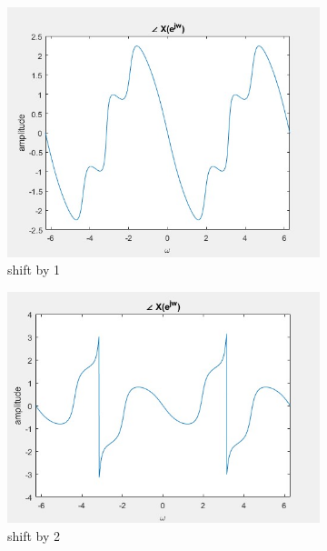 \documentclass[11pt]{article}
\begin{document}
\begin{figure}[h]
\centering
\begin{subfigure}[b]{.3\linewidth}
\includegraphics[width=\linewidth]{secondabout0}
\caption{shift by 1}
\end{subfigure}
\begin{subfigure}[b]{.3\linewidth}
\includegraphics[width=\linewidth]{thirdabout0}
\caption{shift by 2}
\end{subfigure}
\begin{subfigure}[b]{.3\linewidth}

\end{subfigure}
\end{figure}
\end{document}
